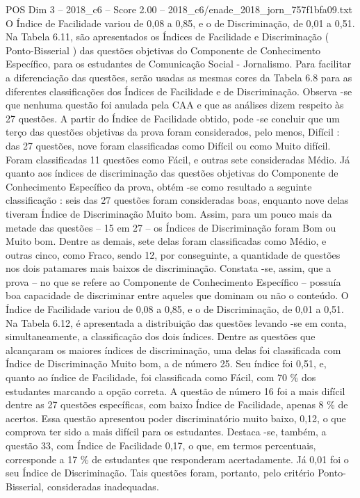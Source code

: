 \begin{textsample}{POS Dim 3 – 2018\_c6 – Score 2.00 – 2018\_c6/enade\_2018\_jorn\_757f1bfa09.txt}
O Índice de Facilidade variou de 0,08 a 0,85, e o de Discriminação, de 0,01 a 0,51.
Na Tabela 6.11, são apresentados os Índices de Facilidade e Discriminação ( Ponto-Bisserial ) das questões objetivas do Componente de Conhecimento Específico, para os estudantes de Comunicação Social - Jornalismo.
Para facilitar a diferenciação das questões, serão usadas as mesmas cores da Tabela 6.8 para as diferentes classificações dos Índices de Facilidade e de Discriminação.
Observa -se que nenhuma questão foi anulada pela CAA e que as análises dizem respeito às 27 questões.
A partir do Índice de Facilidade obtido, pode -se concluir que um terço das questões objetivas da prova foram considerados, pelo menos, Difícil : das 27 questões, nove foram classificadas como Difícil ou como Muito difícil.
Foram classificadas 11 questões como Fácil, e outras sete consideradas Médio.
Já quanto aos índices de discriminação das questões objetivas do Componente de Conhecimento Específico da prova, obtém -se como resultado a seguinte classificação : seis das 27 questões foram consideradas boas, enquanto nove delas tiveram Índice de Discriminação Muito bom.
Assim, para um pouco mais da metade das questões – 15 em 27 – os Índices de Discriminação foram Bom ou Muito bom.
Dentre as demais, sete delas foram classificadas como Médio, e outras cinco, como Fraco, sendo 12, por conseguinte, a quantidade de questões nos dois patamares mais baixos de discriminação.
Constata -se, assim, que a prova – no que se refere ao Componente de Conhecimento Específico – possuía boa capacidade de discriminar entre aqueles que dominam ou não o conteúdo.
O Índice de Facilidade variou de 0,08 a 0,85, e o de Discriminação, de 0,01 a 0,51.
Na Tabela 6.12, é apresentada a distribuição das questões levando -se em conta, simultaneamente, a classificação dos dois índices.
Dentre as questões que alcançaram os maiores índices de discriminação, uma delas foi classificada com Índice de Discriminação Muito bom, a de número 25.
Seu índice foi 0,51, e, quanto ao índice de Facilidade, foi classificada como Fácil, com 70 \% dos estudantes marcando a opção correta.
A questão de número 16 foi a mais difícil dentre as 27 questões específicas, com baixo Índice de Facilidade, apenas 8 \% de acertos.
Essa questão apresentou poder discriminatório muito baixo, 0,12, o que comprova ter sido a mais difícil para os estudantes.
Destaca -se, também, a questão 33, com Índice de Facilidade 0,17, o que, em termos percentuais, corresponde a 17 \% de estudantes que responderam acertadamente.
Já 0,01 foi o seu Índice de Discriminação.
Tais questões foram, portanto, pelo critério Ponto-Bisserial, consideradas inadequadas.

\end{textsample}
